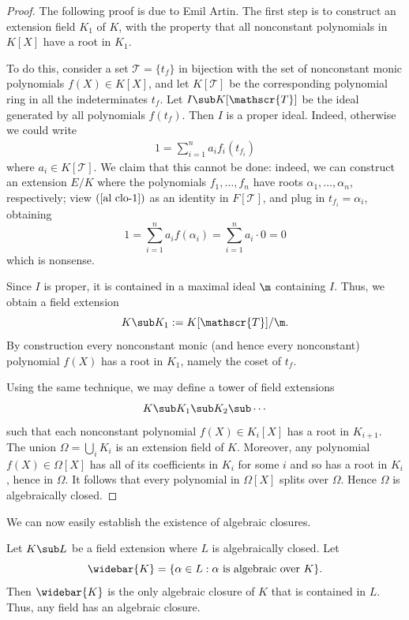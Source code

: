 \begin{proof}
The following proof is due to Emil Artin. The first step is to construct an extension field $K_1$ of $K$, with the property that all nonconstant polynomials in $K[X]$ have a root in $K_1$.\par
To do this, consider a set $\mathscr{T}=\{t_f\}$ in bijection with the set of nonconstant monic polynomials $f(X)\in K[X]$, and let $K[\mathscr{T}]$ be the corresponding polynomial ring in all the indeterminates $t_f$. Let $I\sub K[\mathscr{T}]$ be the ideal generated by all polynomials $f(t_f)$. Then $I$ is a proper ideal. Indeed, otherwise we could write
\begin{align}\label{al clo-1}
1=\sum_{i=1}^{n}a_if_i(t_{f_i})
\end{align}
where $a_i\in K[\mathscr{T}]$. We claim that this cannot be done: indeed, we can construct an extension $E/K$ where the polynomials $f_1,\dots,f_n$ have roots $\alpha_1,\dots,\alpha_n$, respectively; view $(\ref{al clo-1})$ as an identity in $F[\mathscr{T}]$, and plug in $t_{f_i}=\alpha_i$, obtaining
\[1=\sum_{i=1}^{n}a_if(\alpha_i)=\sum_{i=1}^{n}a_i\cdot 0=0\]
which is nonsense.\par
Since $I$ is proper, it is contained in a maximal ideal $\m$ containing $I$. Thus, we obtain a field extension
\[K\sub K_1:=K[\mathscr{T}]/\m.\]
By construction every nonconstant monic (and hence every nonconstant) polynomial $f(X)$ has a root in $K_1$, namely the coset of $t_f$.\par
Using the same technique, we may define a tower of field extensions
\[K\sub K_1\sub K_2\sub\cdots\]
such that each nonconstant polynomial $f(X)\in K_i[X]$ has a root in $K_{i+1}$. The union $\Omega=\bigcup_iK_i$ is an extension field of $K$. Moreover, any polynomial $f(X)\in\Omega[X]$ has all of its coefficients in $K_i$ for some $i$ and so has a root in $K_i$, hence in $\Omega$. It follows that every polynomial in $\Omega[X]$ splits over $\Omega$. Hence $\Omega$ is algebraically closed.
\end{proof}
We can now easily establish the existence of algebraic closures.
\begin{theorem}\label{field ext algebraic closure exist}
Let $K\sub L$ be a field extension where $L$ is algebraically closed. Let
\[\widebar{K}=\{\alpha\in L:\text{$\alpha$ is algebraic over $K$}\}.\]
Then $\widebar{K}$ is the only algebraic closure of $K$ that is contained in $L$. Thus, any field has an algebraic closure.
\end{theorem}
